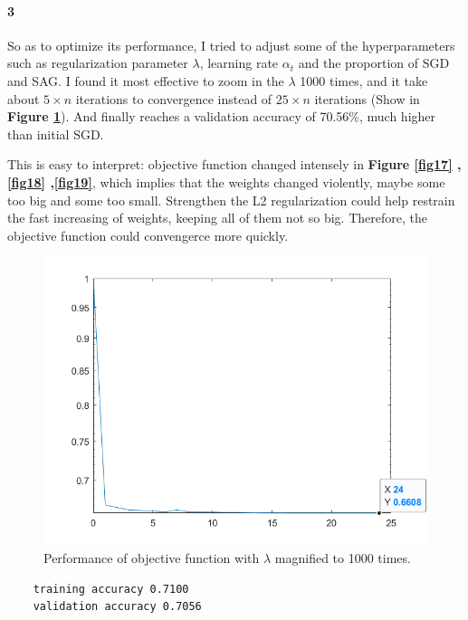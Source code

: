 \documentclass{article}
\begin{document}
\paragraph{3}

So as to optimize its performance, I tried to adjust some of the hyperparameters such as regularization parameter $\lambda$, learning rate $\alpha_t$ and the proportion of SGD and SAG. I found it most effective to zoom in the $\lambda$ 1000 times, and it take about $5\times{n}$ iterations to convergence instead of $25\times{n}$ iterations (Show in \textbf{Figure \ref{fig20}}). And finally reaches a validation accuracy of 70.56\%, much higher than initial SGD.\

This is easy to interpret: objective function changed intensely in \textbf{Figure \ref{fig17} ,\ref{fig18} ,\ref{fig19}}, which implies that the weights changed violently, maybe some too big and some too small. Strengthen the L2 regularization could help restrain the fast increasing of weights, keeping all of them not so big. Therefore, the objective function could convengerce more quickly.

\begin{figure}[H]
	\centering
	\includegraphics[scale=0.5]{figure20}
	\caption{Performance of objective function with $\lambda$ magnified to 1000 times.}
	\label{fig20}
\end{figure}

\begin{commandline}
	\begin{verbatim}
	training accuracy 0.7100
	validation accuracy 0.7056
	\end{verbatim}
\end{commandline}


\end{document}
